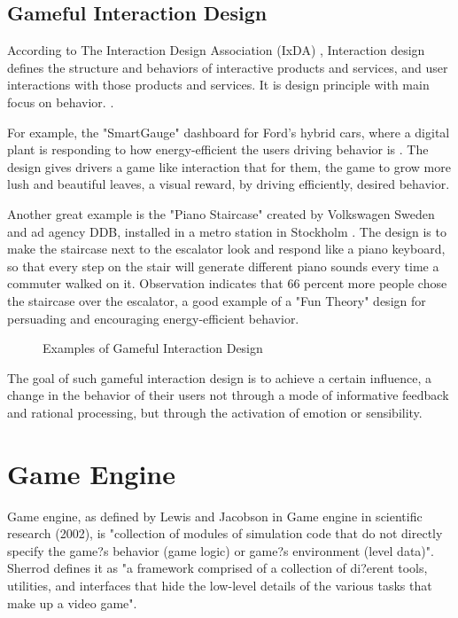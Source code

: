 \subsection{Gameful Interaction Design}
According to The Interaction Design Association (IxDA) \cite {Wroblewski},
Interaction design defines the structure and behaviors of interactive products and services, and user interactions with those products and services. It is design principle with main focus on behavior. \cite {norman2002design}. 

For example, the "SmartGauge" dashboard for Ford's hybrid cars, where a digital plant is responding to how energy-efficient the users driving behavior is \cite {ideo2009}. The design gives drivers a game like interaction that for them, the game to grow more lush and beautiful leaves, a visual reward, by driving efficiently, desired behavior. 

Another great example is the "Piano Staircase" created by Volkswagen Sweden and ad agency DDB, installed in a metro station in Stockholm \cite {funtheory2009}. The design is to make the staircase next to the escalator look and respond like a piano keyboard, so that every step on the stair will generate different piano sounds every time a commuter walked on it. Observation indicates that 66 percent more people chose the staircase over the escalator, a good example of a "Fun Theory" design for persuading and encouraging energy-efficient behavior.

 \begin{figure}[htbp]
	\centering
		\caption{Examples of Gameful Interaction Design}
		\label{fig:ixd}
\end{figure}	

The goal of such gameful interaction design is to achieve a certain influence, a change in the behavior of their users not through a mode of informative feedback and rational processing, but through the activation of emotion or sensibility.

\section{Game Engine}
Game engine, as defined by Lewis and Jacobson in Game engine in scientific research (2002), is "collection of modules of simulation code that do not directly specify the game?s behavior (game logic) or game?s environment (level data)". Sherrod defines it as "a framework comprised of a collection of di?erent tools, utilities, and interfaces that hide the low-level details of the various tasks that make up a video game".

